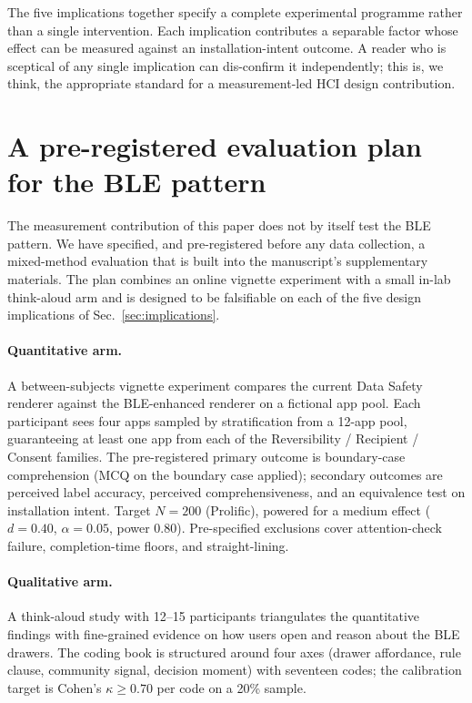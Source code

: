 \documentclass[11pt,a4paper]{article}
\makeatletter
\let\@oldsection\section
\renewcommand{\section}{\FloatBarrier\@oldsection}
\makeatother
\begin{document}
The five implications together specify a complete experimental
programme rather than a single intervention. Each implication
contributes a separable factor whose effect can be measured against
an installation-intent outcome. A reader who is sceptical of any
single implication can dis-confirm it independently; this is, we
think, the appropriate standard for a measurement-led HCI design
contribution.

\section{A pre-registered evaluation plan for the BLE pattern}
\label{sec:eval-plan}

The measurement contribution of this paper does not by itself test
the BLE pattern. We have specified, and pre-registered before any
data collection, a mixed-method evaluation that is built into the
manuscript's supplementary materials. The plan combines an online
vignette experiment with a small in-lab think-aloud arm and is
designed to be falsifiable on each of the five design
implications of Sec.~\ref{sec:implications}.

\paragraph{Quantitative arm.}
A between-subjects vignette experiment compares the current Data
Safety renderer against the BLE-enhanced renderer on a fictional
app pool. Each participant sees four apps sampled by
stratification from a 12-app pool, guaranteeing at least one app
from each of the Reversibility / Recipient / Consent families.
The pre-registered primary outcome is boundary-case comprehension
(MCQ on the boundary case applied); secondary outcomes are
perceived label accuracy, perceived comprehensiveness, and an
equivalence test on installation intent. Target $N{=}200$
(Prolific), powered for a medium effect ($d{=}0.40$, $\alpha{=}0.05$,
power $0.80$). Pre-specified exclusions cover attention-check
failure, completion-time floors, and straight-lining.

\paragraph{Qualitative arm.}
A think-aloud study with 12--15 participants triangulates the
quantitative findings with fine-grained evidence on how users open
and reason about the BLE drawers. The coding book is structured
around four axes (drawer affordance, rule clause, community signal,
decision moment) with seventeen codes; the calibration target is
Cohen's $\kappa \geq 0.70$ per code on a 20\% sample.
\end{document}
